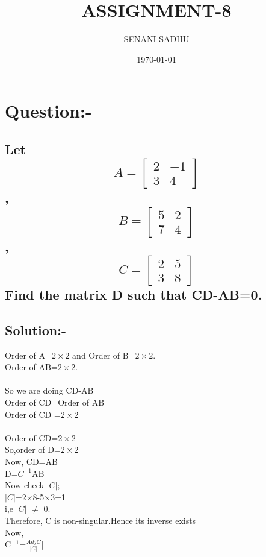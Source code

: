 \documentclass[a4paper,12pt]{article}
\title{ASSIGNMENT-8}
\author{SENANI SADHU}
\date{\today}
\begin{document}
	\maketitle
	\newpage
	\section{Question:-}
	\subsection{Let \[A=\begin{bmatrix}
		2 & -1\\
		3 & 4
	\end{bmatrix}\],\[B=\begin{bmatrix}
	5 & 2\\
	7 & 4
\end{bmatrix}\],
\[C=\begin{bmatrix}
	2 & 5\\
	3 & 8
\end{bmatrix}\]
Find the matrix D such that CD-AB=0.}
\subsection{Solution:-}
Order of A=$2\times2$ and Order of B=$2\times2$.\\
Order of AB=$2\times2$.\\\\
So we are doing CD-AB\\
Order of CD=Order of AB\\
Order of CD =$2\times2$\\\\
Order of CD=$2\times2$\\
So,order of D=$2\times2$\\
Now, CD=AB\\
D=$C^{-1}$AB\\
Now check $|C|$;\\

$|C|$=2$\times8$-5$\times3$=1\\

i,e $|C|$ $\not=$ 0.\\

Therefore, C is non-singular.Hence its inverse exists\\

Now,\\

C$^-$$^1$=$\frac{Adj C}{|C|}$|\\
\end{document}
